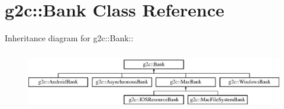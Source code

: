 \hypertarget{classg2c_1_1_bank}{
\section{g2c::Bank Class Reference}
\label{classg2c_1_1_bank}
}
Inheritance diagram for g2c::Bank::\begin{figure}[H]
\begin{center}
\leavevmode
\includegraphics[height=2.6087cm]{classg2c_1_1_bank}
\end{center}
\end{figure}
